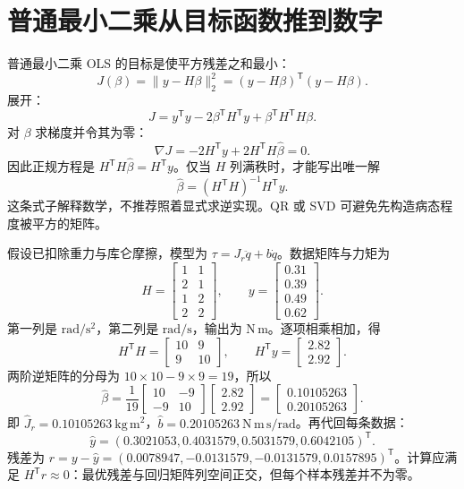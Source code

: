 \section{普通最小二乘从目标函数推到数字}
普通最小二乘 OLS 的目标是使平方残差之和最小：
\[
 J(\beta)=\|y-H\beta\|_2^2=(y-H\beta)^{\mathsf T}(y-H\beta).
\]
展开：
\[
 J=y^{\mathsf T}y-2\beta^{\mathsf T}H^{\mathsf T}y+\beta^{\mathsf T}H^{\mathsf T}H\beta.
\]
对 $\beta$ 求梯度并令其为零：
\[
 \nabla J=-2H^{\mathsf T}y+2H^{\mathsf T}H\hat\beta=0.
\]
因此正规方程是 $H^{\mathsf T}H\hat\beta=H^{\mathsf T}y$。仅当 $H$ 列满秩时，才能写出唯一解
\begin{equation}
 \hat\beta=(H^{\mathsf T}H)^{-1}H^{\mathsf T}y.
\end{equation}
这条式子解释数学，不推荐照着显式求逆实现。QR 或 SVD 可避免先构造病态程度被平方的矩阵。

\begin{examplebox}[算例 8A 四条数据完整求惯量与黏性系数]
假设已扣除重力与库仑摩擦，模型为 $\tau=J_r\ddot q+b\dot q$。数据矩阵与力矩为
\[
 H=\begin{bmatrix}1&1\\2&1\\1&2\\2&2\end{bmatrix},\qquad
 y=\begin{bmatrix}0.31\\0.39\\0.49\\0.62\end{bmatrix}.
\]
第一列是 $\mathrm{rad/s^2}$，第二列是 $\mathrm{rad/s}$，输出为 $\mathrm{N\,m}$。逐项相乘相加，得
\[
 H^{\mathsf T}H=\begin{bmatrix}10&9\\9&10\end{bmatrix},\qquad
 H^{\mathsf T}y=\begin{bmatrix}2.82\\2.92\end{bmatrix}.
\]
两阶逆矩阵的分母为 $10\times10-9\times9=19$，所以
\[
 \hat\beta=\frac1{19}\begin{bmatrix}10&-9\\-9&10\end{bmatrix}
 \begin{bmatrix}2.82\\2.92\end{bmatrix}
 =\begin{bmatrix}0.10105263\\0.20105263\end{bmatrix}.
\]
即 $\hat J_r=0.10105263\ \mathrm{kg\,m^2}$，$\hat b=0.20105263\ \mathrm{N\,m\,s/rad}$。再代回每条数据：
\[
 \hat y=(0.3021053,0.4031579,0.5031579,0.6042105)^{\mathsf T}.
\]
残差为 $r=y-\hat y=(0.0078947,-0.0131579,-0.0131579,0.0157895)^{\mathsf T}$。计算应满足 $H^{\mathsf T}r\approx0$：最优残差与回归矩阵列空间正交，但每个样本残差并不为零。
\end{examplebox}

